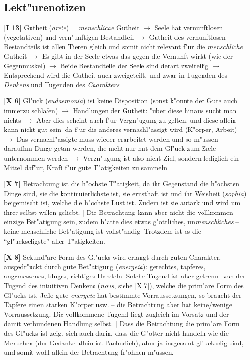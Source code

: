 \documentclass[emulatestandardclasses]{scrartcl}
\begin{document}
\subsection{Lekt"urenotizen}

\noindent \textbf{[I 13]} Gutheit (\emph{aret\={e}}) = \emph{menschliche} Gutheit $\rightarrow$ Seele hat vernunftlosen (vegetativen) und vern"unftigen Bestandteil $\rightarrow$ Gutheit des vernunftlosen Bestandteils ist allen Tieren gleich und somit nicht relevant f"ur die \emph{menschliche} Gutheit $\rightarrow$ Es gibt in der Seele etwas das gegen die Vernunft wirkt (wie der Gegenmuskel) $\rightarrow$ Beide Bestandteile der Seele sind derart zweiteilig $\rightarrow$ Entsprechend wird die Gutheit auch zweigeteilt, und zwar in Tugenden des \emph{Denkens} und Tugenden des \emph{Charakters}\newline

\noindent \textbf{[X 6]} Gl"uck (\emph{eudaemonia}) ist keine Disposition (sonst k"onnte der Gute auch immerzu schlafen) $\rightarrow$ Handlungen der Gutheit: "uber diese hinaus sucht man nichts $\rightarrow$ Aber dies scheint auch f"ur Vergn"ugung zu gelten, und diese allein kann nicht gut sein, da f"ur die anderes vernachl"assigt wird (K"orper, Arbeit) $\rightarrow$ Das vernachl"assigte muss wieder erarbeitet werden und so m"ussen daraufhin Dinge getan werden, die nicht nur mit dem Gl"uck zum Ziele unternommen werden $\rightarrow$ Vergn"ugung ist also nicht Ziel, sondern lediglich ein Mittel daf"ur, Kraft f"ur gute T"atigkeiten zu sammeln \newline

\noindent \textbf{[X 7]} Betrachtung ist die h"ochste T"atigkeit, da ihr Gegenstand die h"ochsten Dinge sind, sie die kontinuierlichste ist, sie ernsthaft ist und ihr Weisheit (\emph{sophia}) beigemischt ist, welche die h"ochste Lust ist. Zudem ist sie autark und wird um ihrer selbst willen geliebt. | Die Betrachtung kann aber nicht die vollkommen einzige Bet"atigung sein, zudem h"atte dies etwas g"ottliches, un\emph{menschliches} -- keine menschliche Bet"atigung ist vollst"andig. Trotzdem ist es die "`gl"uckseligste"' aller T"atigkeiten.\newline

\noindent \textbf{[X 8]} Sekund"are Form des Gl"ucks wird erlangt durch guten Charakter, ausgedr"uckt durch gute Bet"atigung (\emph{energeia}): gerechtes, tapferes, angemessenes, kluges, richtiges Handeln. Solche Tugend ist aber getrennt von der Tugend des intuitiven Denkens (\emph{nous}, siehe [X 7]), welche die prim"are Form des Gl"ucks ist. Jede gute \emph{energeia} hat bestimmte Vorraussetzungen, so braucht der Tapfere einen starken K"orper usw. -- die Betrachtung aber hat keine/wenige Vorraussetzung. Die vollkommene Tugend liegt zugleich im Vorsatz und der damit verbundenen Handlung selbst. | Dass die Betrachtung die prim"are Form des Gl"ucks ist zeigt sich auch darin, dass die G"otter nicht handeln wie die Menschen (der Gedanke allein ist l"acherlich), aber ja insgesamt gl"uckselig sind, und somit wohl allein der Betrachtung fr"ohnen m"ussen.\newline
\end{document}
